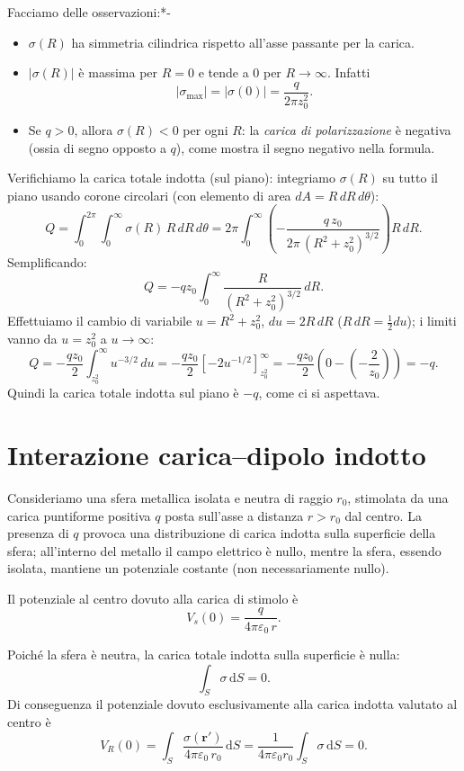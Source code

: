 \documentclass{book}
\begin{document}
Facciamo delle osservazioni:*-
\begin{itemize}
  \item \(\sigma(R)\) ha simmetria cilindrica rispetto all'asse passante per la carica.
  \item \(|\sigma(R)|\) è massima per \(R=0\) e tende a \(0\) per \(R\to\infty\). Infatti
  \[
  |\sigma_{\max}|=\left|\sigma(0)\right|=\frac{q}{2\pi z_0^2}.
  \]
  \item Se \(q>0\), allora \(\sigma(R)<0\) per ogni \(R\): la \emph{carica di polarizzazione} è negativa (ossia di segno opposto a \(q\)), come mostra il segno negativo nella formula.

\end{itemize}
Verifichiamo la carica totale indotta (sul piano): integriamo \(\sigma(R)\) su tutto il piano usando corone circolari (con elemento di area \(dA=R\,dR\,d\theta\)):
\[
Q=\int_{0}^{2\pi}\!\int_{0}^{\infty}\sigma(R)\,R\,dR\,d\theta
=2\pi\int_{0}^{\infty}\left(-\frac{q\,z_0}{2\pi\,(R^2+z_0^2)^{3/2}}\right)R\,dR.
\]
Semplificando:
\[
Q = -q z_0 \int_{0}^{\infty}\frac{R}{(R^2+z_0^2)^{3/2}}\,dR.
\]
Effettuiamo il cambio di variabile \(u=R^2+z_0^2\), \(du=2R\,dR\) (\(R\,dR=\tfrac{1}{2}du\)); i limiti vanno da \(u=z_0^2\) a \(u\to\infty\):
\[
Q = -\frac{q z_0}{2}\int_{z_0^2}^{\infty} u^{-3/2}\,du
= -\frac{q z_0}{2}\left[-2u^{-1/2}\right]_{z_0^2}^{\infty}
= -\frac{q z_0}{2}\left(0 - \left(-\frac{2}{z_0}\right)\right) = -q.
\]
Quindi la carica totale indotta sul piano è \(-q\), come ci si aspettava.


\section{Interazione carica--dipolo indotto}

Consideriamo una sfera metallica isolata e neutra di raggio $r_0$, stimolata da una carica puntiforme positiva $q$ posta sull'asse a distanza $r>r_0$ dal centro. La presenza di $q$ provoca una distribuzione di carica indotta sulla superficie della sfera; all'interno del metallo il campo elettrico è nullo, mentre la sfera, essendo isolata, mantiene un potenziale costante (non necessariamente nullo).

Il potenziale al centro dovuto alla carica di stimolo è
\[
V_s(0)=\frac{q}{4\pi\varepsilon_0\,r}.
\]

Poiché la sfera è neutra, la carica totale indotta sulla superficie è nulla:
\[
\int_{S}\sigma\,\mathrm{d}S = 0.
\]
Di conseguenza il potenziale dovuto esclusivamente alla carica indotta valutato al centro è
\[
V_R(0)=\int_{S}\frac{\sigma(\mathbf r')}{4\pi\varepsilon_0\,r_0}\,\mathrm{d}S
= \frac{1}{4\pi\varepsilon_0 r_0}\int_{S}\sigma\,\mathrm{d}S = 0.
\]
\end{document}
